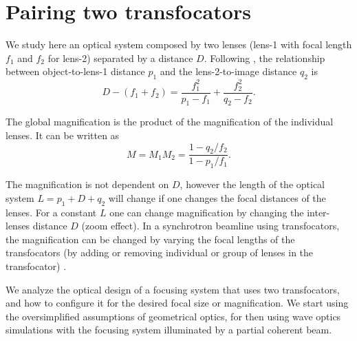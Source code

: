 \documentclass{iucr}              %
\begin{document}
\section{Pairing two transfocators}\label{sec:twolenses}


We study here an optical system composed by two lenses (lens-1 with focal length $f_1$ and $f_2$ for lens-2) separated by a distance $D$. Following , the relationship between object-to-lens-1 distance $p_1$ and the lens-2-to-image distance $q_2$ is
\begin{equation}
\label{eq:twolens}
    D-(f_1+f_2)=\frac{f_1^2}{p_1-f_1} + \frac{f_2^2}{q_2-f_2}.
\end{equation}

The global magnification is the product of the magnification of the individual lenses. It can be written as
\begin{equation}
\label{eq:magnification}
    M=M_1 M_2=\frac{1-q_2/f_2}{1-p_1/f_1}.
\end{equation}

The magnification is not dependent on $D$, however the length of the optical system $L=p_1+D+q_2$ will change if one changes the focal distances of the lenses. For a constant $L$ one can change magnification by changing the inter-lenses distance $D$ (zoom effect). In a synchrotron beamline using transfocators, the magnification can be changed by varying the focal lengths of the transfocators (by adding or removing individual or group of lenses in the transfocator) \cite{Vaughan:kv5084}.

We analyze the optical design of a focusing system that uses two transfocators, and how to configure it for the desired focal size or magnification. We start using the oversimplified assumptions of geometrical optics, for then using wave optics simulations with the focusing system illuminated by a partial coherent beam.
\end{document}
